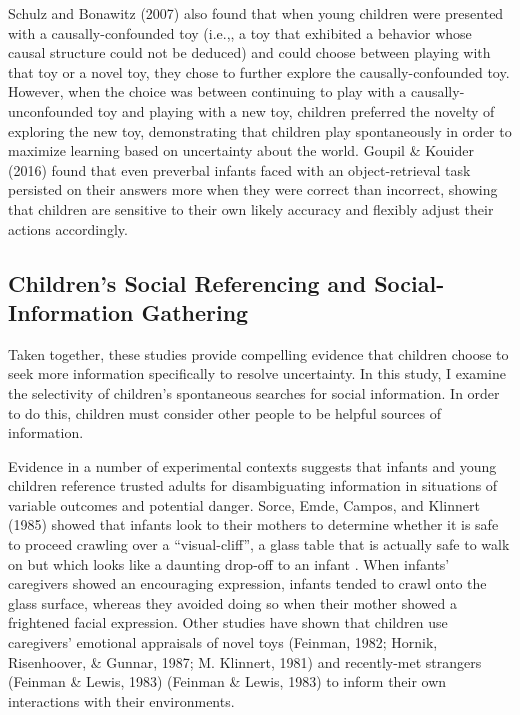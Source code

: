 \documentclass[man]{apa6}
\theoremstyle{definition}
\theoremstyle{definition}
\theoremstyle{definition}
\theoremstyle{remark}
\begin{document}
Schulz and Bonawitz (2007) also found that when young children were
presented with a causally-confounded toy (i.e.,, a toy that exhibited a
behavior whose causal structure could not be deduced) and could choose
between playing with that toy or a novel toy, they chose to further
explore the causally-confounded toy. However, when the choice was
between continuing to play with a causally-unconfounded toy and playing
with a new toy, children preferred the novelty of exploring the new toy,
demonstrating that children play spontaneously in order to maximize
learning based on uncertainty about the world. Goupil \& Kouider (2016)
found that even preverbal infants faced with an object-retrieval task
persisted on their answers more when they were correct than incorrect,
showing that children are sensitive to their own likely accuracy and
flexibly adjust their actions accordingly.

\subsection{Children's Social Referencing and Social-Information
Gathering}\label{childrens-social-referencing-and-social-information-gathering}

Taken together, these studies provide compelling evidence that children
choose to seek more information specifically to resolve uncertainty. In
this study, I examine the selectivity of children's spontaneous searches
for social information. In order to do this, children must consider
other people to be helpful sources of information.

Evidence in a number of experimental contexts suggests that infants and
young children reference trusted adults for disambiguating information
in situations of variable outcomes and potential danger. Sorce, Emde,
Campos, and Klinnert (1985) showed that infants look to their mothers to
determine whether it is safe to proceed crawling over a
\enquote{visual-cliff}, a glass table that is actually safe to walk on
but which looks like a daunting drop-off to an infant . When infants'
caregivers showed an encouraging expression, infants tended to crawl
onto the glass surface, whereas they avoided doing so when their mother
showed a frightened facial expression. Other studies have shown that
children use caregivers' emotional appraisals of novel toys (Feinman,
1982; Hornik, Risenhoover, \& Gunnar, 1987; M. Klinnert, 1981) and
recently-met strangers (Feinman \& Lewis, 1983) (Feinman \& Lewis, 1983)
to inform their own interactions with their environments.
\end{document}
